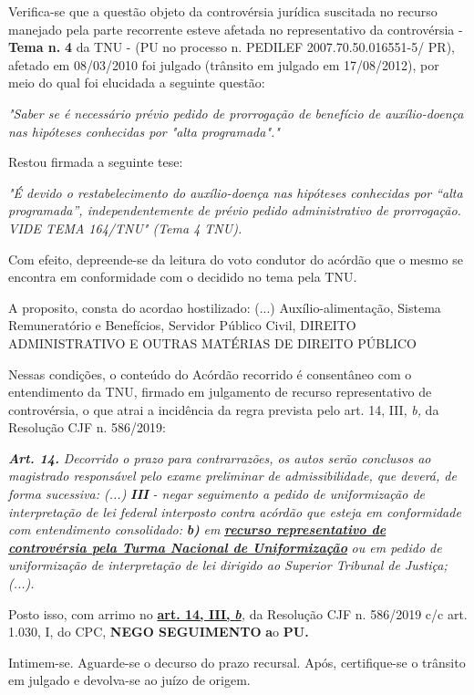 \documentclass[12pt]{article}
\begin{document}
\justifying
\noindent Verifica-se que a questão objeto da controvérsia jurídica suscitada no recurso manejado pela parte recorrente esteve afetada no representativo da controvérsia - \textbf{Tema n. }\textbf{4} da TNU - (PU no processo n. PEDILEF 2007.70.50.016551-5/ PR),  afetado em 08/03/2010 foi julgado (trânsito em julgado em 17/08/2012), por meio do qual foi elucidada a seguinte questão:

\noindent \textit{"Saber se é necessário prévio pedido de prorrogação de benefício de auxílio-doença nas hipóteses conhecidas por "alta programada"."}

\noindent Restou firmada a seguinte tese:

\noindent \textit{"É devido o restabelecimento do auxílio-doença nas hipóteses conhecidas por “alta programada”, independentemente de prévio pedido administrativo de prorrogação. VIDE TEMA 164/TNU" (Tema 4 TNU).}

\noindent Com efeito, depreende-se da leitura do voto condutor do acórdão que o mesmo se encontra em conformidade com o decidido no  tema pela TNU.

\noindent A proposito, consta do acordao hostilizado: (...) Auxílio-alimentação, Sistema Remuneratório e Benefícios, Servidor Público Civil, DIREITO ADMINISTRATIVO E OUTRAS MATÉRIAS DE DIREITO PÚBLICO

\noindent Nessas condições, o conteúdo do Acórdão recorrido é consentâneo com o entendimento da TNU, firmado em julgamento de recurso representativo de controvérsia, o que atrai a incidência da regra prevista pelo art. 14, III, \textit{b,} da Resolução CJF n. 586/2019:

\noindent \textit{\textbf{Art. 14.}}\textit{ Decorrido o prazo para contrarrazões, os autos serão conclusos ao magistrado responsável pelo exame preliminar de admissibilidade, que deverá, de forma sucessiva: (...) }\textit{\textbf{III }}\textit{- negar seguimento a pedido de uniformização de interpretação de lei federal interposto contra acórdão que esteja em conformidade com entendimento consolidado: }\textit{\textbf{b)}}\textit{ em }\uline{\textit{\textbf{recurso representativo de controvérsia pela Turma Nacional de Uniformização}}}\textit{ ou em pedido de uniformização de interpretação de lei dirigido ao Superior Tribunal de Justiça;(...).}

\noindent Posto isso, com arrimo no \uline{\textbf{art. 14, III, }}\uline{\textit{\textbf{b}}}\textit{,} da Resolução CJF n. 586/2019 c/c art. 1.030, I, do CPC, \textbf{NEGO SEGUIMENTO }\textbf{a}o\textbf{ PU}\textbf{.}

\noindent Intimem-se. Aguarde-se o decurso do prazo recursal. Após, certifique-se o trânsito em julgado e devolva-se ao juízo de origem.
\end{document}
